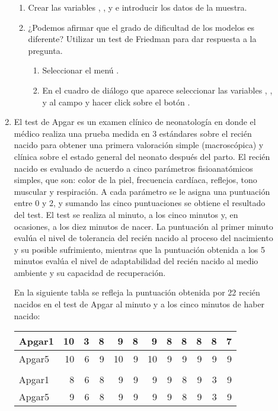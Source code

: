 \begin{description}
\begin{enumerate}[leftmargin=*]
\begin{enumerate}
\item Crear las variables , ,  y  e introducir los datos de la muestra.

\item ¿Podemos afirmar que el grado de dificultad de los modelos es diferente? Utilizar un test de Friedman para dar respuesta a la pregunta.
\begin{indicacion}
\begin{enumerate}
\item  Seleccionar el menú .
\item En el cuadro de diálogo que aparece seleccionar las variables , ,  y  al campo  y hacer click sobre el botón .
\end{enumerate}
\end{indicacion}

\end{enumerate}


\item El test de Apgar es un examen clínico de neonatología en donde el médico realiza una prueba medida en 3 estándares sobre el recién nacido para obtener una primera valoración simple (macroscópica) y clínica sobre el estado general del neonato después del parto. El recién nacido es evaluado de acuerdo a cinco parámetros fisioanatómicos simples, que son: color de la piel, frecuencia cardíaca, reflejos, tono muscular y respiración. A cada parámetro se le asigna una puntuación entre 0 y 2, y sumando las cinco puntuaciones se obtiene el resultado del test.
El test se realiza al minuto, a los cinco minutos y, en ocasiones, a los diez minutos de nacer. La puntuación al primer minuto evalúa el nivel de tolerancia del recién nacido al proceso del nacimiento y su posible sufrimiento, mientras que la puntuación obtenida a los 5 minutos evalúa el nivel de adaptabilidad del recién nacido al medio ambiente y su capacidad de recuperación.

En la siguiente tabla se refleja la puntuación obtenida por 22 recién nacidos en el test de Apgar al minuto y a los cinco minutos de haber nacido:
\begin{center}
\begin{tabular}{lrrrrrrrrrrr}
\hline
Apgar1 & 10 & 3 & 8 & 9 & 8 & 9 & 8 & 8 & 8 & 8 & 7 \\
\hline
Apgar5 & 10 & 6 & 9 & 10 & 9 & 10 & 9 & 9 & 9 & 9 & 9 \\
\hline
\\
\hline
Apgar1 & 8 & 6 & 8 & 9 & 9 & 9 & 9 & 8 & 9 & 3 & 9 \\
\hline
Apgar5 & 9 & 6 & 8 & 9 & 9 & 9 & 9 & 8 & 9 & 3 & 9 \\
\hline
\end{tabular}
\end{center}


\end{enumerate}
\end{description}
